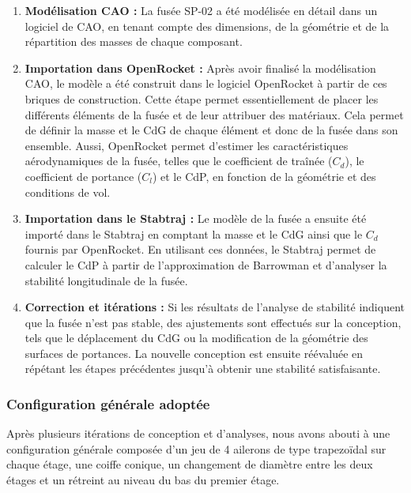\hspace*{-\parindent}%
\begin{minipage}{0.75\textwidth}
    \begin{enumerate}
        \item \textbf{Modélisation \acrshort{CAO} :} La fusée SP-02 a été modélisée en détail dans un logiciel de \acrshort{CAO},
        en tenant compte des dimensions, de la géométrie et de la répartition des masses de chaque composant.
        
        \item \textbf{Importation dans \gls{OpenRocket} :} Après avoir finalisé la modélisation \acrshort{CAO}, le modèle a été
        construit dans le logiciel \gls{OpenRocket} à partir de ces briques de construction. Cette étape permet essentiellement de
        placer les différents éléments de la fusée et de leur attribuer des matériaux. Cela permet de définir la masse et le
        \acrfull{CdG} de chaque élément et donc de la fusée dans son ensemble. Aussi, \gls{OpenRocket} permet d'estimer les
        caractéristiques aérodynamiques de la fusée, telles que le coefficient de traînée ($C_d$), le coefficient de portance
        ($C_l$) et le \acrfull{CdP}, en fonction de la géométrie et des conditions de vol.

        \item \textbf{Importation dans le \gls{Stabtraj} :} Le modèle de la fusée a ensuite été importé dans le \gls{Stabtraj} en
        comptant la masse et le \acrshort{CdG} ainsi que le $C_d$ fournis par \gls{OpenRocket}. En utilisant ces données, le
        \gls{Stabtraj} permet de calculer le \acrshort{CdP} à partir de l'approximation de Barrowman \cite{Stab_doc} et d'analyser
        la stabilité longitudinale de la fusée.

        \item \textbf{Correction et itérations :} Si les résultats de l'analyse de stabilité indiquent que la fusée n'est pas
        stable, des ajustements sont effectués sur la conception, tels que le déplacement du \acrshort{CdG} ou la modification de
        la géométrie des surfaces de portances. La nouvelle conception est ensuite réévaluée en répétant les étapes précédentes
        jusqu'à obtenir une stabilité satisfaisante.
    \end{enumerate}

    \vspace{-0.5cm}

    \subsubsection{Configuration générale adoptée}
    Après plusieurs itérations de conception et d'analyses, nous avons abouti à une configuration générale composée d'un jeu de 4
    ailerons de type trapezoïdal sur chaque étage, une coiffe conique, un changement de diamètre entre les deux étages et un
    rétreint au niveau du bas du premier étage.\\


\end{minipage}
